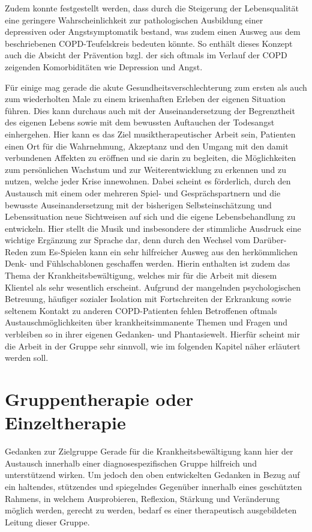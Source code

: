 Zudem konnte festgestellt werden, dass durch die Steigerung der Lebensqualität eine geringere Wahrscheinlichkeit zur pathologischen Ausbildung einer depressiven oder Angstsymptomatik bestand, was zudem einen Ausweg aus dem beschriebenen COPD-Teufelskreis bedeuten könnte. So enthält dieses Konzept auch die Absicht der Prävention bzgl. der sich oftmals im Verlauf der COPD zeigenden Komorbiditäten wie Depression und Angst.

Für einige mag gerade die akute Gesundheitsverschlechterung zum ersten als auch zum wiederholten Male zu einem krisenhaften Erleben der eigenen Situation führen. Dies kann durchaus auch mit der Auseinandersetzung der Begrenztheit des eigenen Lebens sowie mit dem bewussten Auftauchen der Todesangst einhergehen. Hier kann es das Ziel musiktherapeutischer Arbeit sein, Patienten einen Ort für die Wahrnehmung, Akzeptanz und den Umgang mit den damit verbundenen Affekten zu eröffnen und sie darin zu begleiten, die Möglichkeiten zum persönlichen Wachstum und zur Weiterentwicklung zu erkennen und zu nutzen, welche jeder Krise innewohnen. Dabei scheint es förderlich, durch den Austausch mit einem oder mehreren Spiel- und Gesprächspartnern und die bewusste Auseinandersetzung mit der bisherigen Selbsteinschätzung und Lebenssituation neue Sichtweisen auf sich und die eigene Lebensbehandlung zu entwickeln. Hier stellt die Musik und insbesondere der stimmliche Ausdruck eine wichtige Ergänzung zur Sprache dar, denn durch den Wechsel vom Darüber-Reden zum Es-Spielen kann ein sehr hilfreicher Ausweg aus den herkömmlichen Denk- und Fühlschablonen geschaffen werden. Hierin enthalten ist zudem das Thema der Krankheitsbewältigung, welches mir für die Arbeit mit diesem Klientel als sehr wesentlich erscheint. Aufgrund der mangelnden psychologischen Betreuung, häufiger sozialer Isolation mit Fortschreiten der Erkrankung sowie seltenem Kontakt zu anderen COPD-Patienten fehlen Betroffenen oftmals Austauschmöglichkeiten über krankheitsimmanente Themen und Fragen und verbleiben so in ihrer eigenen Gedanken- und Phantasiewelt. Hierfür scheint mir die Arbeit in der Gruppe sehr sinnvoll, wie im folgenden Kapitel näher erläutert werden soll.


\section{Gruppentherapie oder Einzeltherapie}
\label{gruppentherapie_oder_einzeltherapie}
Gedanken zur Zielgruppe
Gerade für die Krankheitsbewältigung kann hier der Austausch innerhalb einer diagnosespezifischen Gruppe hilfreich und unterstützend wirken. Um jedoch den oben entwickelten Gedanken in Bezug auf ein haltendes, stützendes und spiegelndes Gegenüber innerhalb eines geschützten Rahmens, in welchem Ausprobieren, Reflexion, Stärkung und Veränderung möglich werden, gerecht zu werden, bedarf es einer therapeutisch ausgebildeten Leitung dieser Gruppe. 

